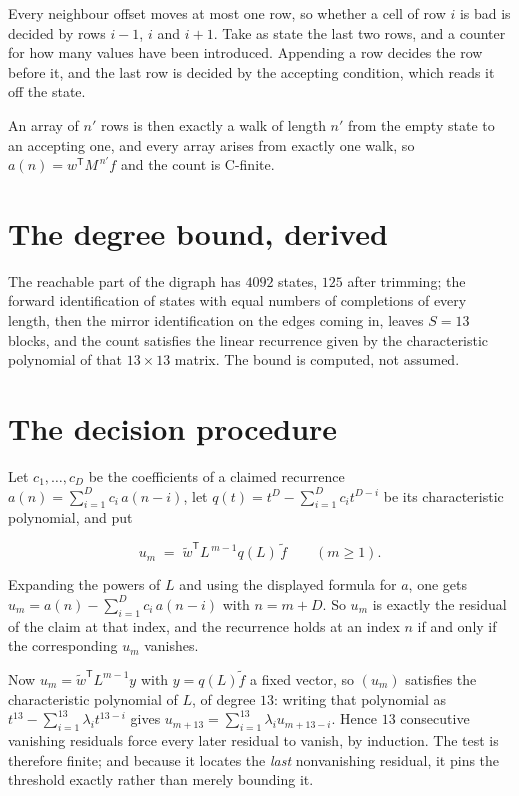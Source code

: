 \documentclass[11pt]{article}
\theoremstyle{definition}
\begin{document}
Every neighbour offset moves at most one row, so whether a cell of row $i$ is bad is decided by rows $i-1$, $i$ and $i+1$. Take as state the last two rows, and a counter for how many values have been introduced. Appending a row decides the row before it, and the last row is decided by the accepting condition, which reads it off the state.

An array of $n'$ rows is then exactly a walk of length $n'$ from the empty state to an accepting one, and every array arises from exactly one walk, so $a(n) = w^{\mathsf T}M^{\,n'}f$ and the count is C-finite.

\section{The degree bound, derived}

The reachable part of the digraph has $4092$ states, $125$ after trimming; the forward identification of states with equal numbers of completions of every length, then the mirror identification on the edges coming in, leaves $S = 13$ blocks, and the count satisfies the linear recurrence given by the characteristic polynomial of that $13\times13$ matrix. The bound is computed, not assumed.

\section{The decision procedure}

Let $c_1,\dots,c_D$ be the coefficients of a claimed recurrence $a(n) = \sum_{i=1}^{D} c_i\,a(n-i)$, let $q(t) = t^{D} - \sum_{i=1}^{D} c_i t^{D-i}$ be its characteristic polynomial, and put

\[u_m \;=\; \tilde w^{\mathsf T} L^{\,m-1} q(L)\,\tilde f \qquad (m \ge 1).\]

Expanding the powers of $L$ and using the displayed formula for $a$, one gets $u_m = a(n) - \sum_{i=1}^{D} c_i\,a(n-i)$ with $n = m + D$. So $u_m$ is exactly the residual of the claim at that index, and the recurrence holds at an index $n$ if and only if the corresponding $u_m$ vanishes.

Now $u_m = \tilde w^{\mathsf T} L^{m-1} y$ with $y = q(L)\tilde f$ a fixed vector, so $(u_m)$ satisfies the characteristic polynomial of $L$, of degree $13$: writing that polynomial as $t^{13} - \sum_{i=1}^{13} \lambda_i t^{13-i}$ gives $u_{m+13} = \sum_{i=1}^{13} \lambda_i u_{m+13-i}$. Hence $13$ consecutive vanishing residuals force every later residual to vanish, by induction. The test is therefore finite; and because it locates the {\itshape last} nonvanishing residual, it pins the threshold exactly rather than merely bounding it.
\end{document}
